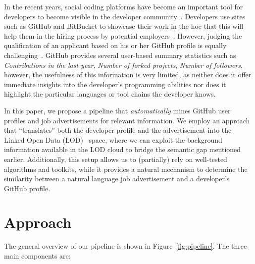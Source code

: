 \documentclass[conference]{IEEEtran}
\begin{document}
In the recent years, social coding platforms have become an important tool for
developers to become visible in the developer community~\cite{Capil13}.
Developers use sites such as GitHub and BitBucket to showcase their work in the
hoe that this will help them in the hiring process by potential
employers~\cite{dabbish2012social}. However, judging the qualification of an
applicant based on his or her GitHub profile is equally
challenging~\cite{Singer:2013:MAS:2441776.2441791}. GitHub provides several
user-based summary statistics such as \emph{Contributions in the last year},
\emph{Number of forked projects}, \emph{Number of followers}, however, the
usefulness of this information is very limited, as neither does it offer
immediate insights into the developer's programming abilities nor does it
highlight the particular languages or tool chains the developer knows.

%
In this paper, we propose a pipeline that \emph{automatically} mines GitHub user
profiles and job advertisements for relevant information. We employ an approach
that ``translates'' both the developer profile and the advertisement into the
Linked Open Data (LOD)~\cite{bizer2009linked} space, where we can exploit the
background information available in the LOD cloud to bridge the semantic gap
mentioned earlier. Additionally, this setup allows us to (partially) rely on
well-tested algorithms and toolkits, while it provides a natural mechanism to
determine the similarity between a natural language job advertisement and a
developer's GitHub profile.


\section{Approach}

The general overview of our pipeline is shown in Figure~\ref{fig:pipeline}.
The three main components are:
\end{document}

